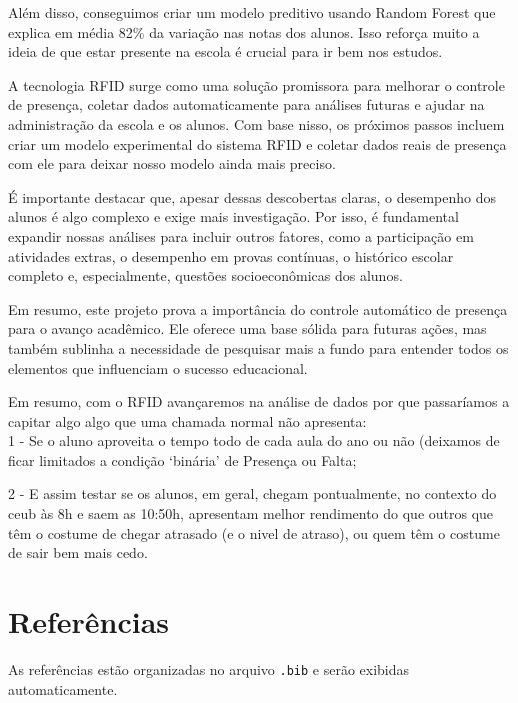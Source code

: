 \documentclass[
  letterpaper,
  DIV=11,
  numbers=noendperiod,
  openany]{scrreprt}
\begin{document}
Além disso, conseguimos criar um modelo preditivo usando Random Forest
que explica em média 82\% da variação nas notas dos alunos. Isso reforça
muito a ideia de que estar presente na escola é crucial para ir bem nos
estudos.

A tecnologia RFID surge como uma solução promissora para melhorar o
controle de presença, coletar dados automaticamente para análises
futuras e ajudar na administração da escola e os alunos. Com base nisso,
os próximos passos incluem criar um modelo experimental do sistema RFID
e coletar dados reais de presença com ele para deixar nosso modelo ainda
mais preciso.

É importante destacar que, apesar dessas descobertas claras, o
desempenho dos alunos é algo complexo e exige mais investigação. Por
isso, é fundamental expandir nossas análises para incluir outros
fatores, como a participação em atividades extras, o desempenho em
provas contínuas, o histórico escolar completo e, especialmente,
questões socioeconômicas dos alunos.

Em resumo, este projeto prova a importância do controle automático de
presença para o avanço acadêmico. Ele oferece uma base sólida para
futuras ações, mas também sublinha a necessidade de pesquisar mais a
fundo para entender todos os elementos que influenciam o sucesso
educacional.

Em resumo, com o RFID avançaremos na análise de dados por que
passaríamos a capitar algo algo que uma chamada normal não apresenta:\\

1 - Se o aluno aproveita o tempo todo de cada aula do ano ou não
(deixamos de ficar limitados a condição `binária' de Presença ou Falta;

2 - E assim testar se os alunos, em geral, chegam pontualmente, no
contexto do ceub às 8h e saem as 10:50h, apresentam melhor rendimento do
que outros que têm o costume de chegar atrasado (e o nivel de atraso),
ou quem têm o costume de sair bem mais cedo.


\chapter{Referências}\label{referuxeancias}

As referências estão organizadas no arquivo \texttt{.bib} e serão
exibidas automaticamente.

\label{refs}
\end{document}
